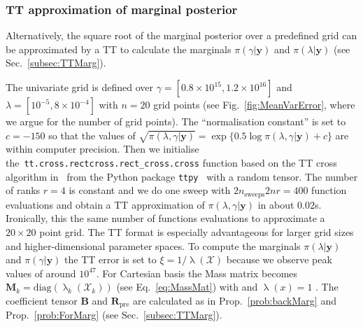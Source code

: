 \subsubsection{TT approximation of marginal posterior}
\label{subsec:TTFirst}
Alternatively, the square root of the marginal posterior over a predefined grid can be approximated by a TT to calculate the marginals $\pi(\gamma|\bm{y})$ and $\pi(\lambda|\bm{y})$ (see Sec.~\ref{subsec:TTMarg}).

The univariate grid is defined over $\gamma = [ 0.8 \times 10^{15},1.2 \times 10^{16}]$ and $\lambda = [ 10^{-5}, 8 \times 10^{-4}]$ with $n = 20$ grid points (see Fig.~\ref{fig:MeanVarError}, where we argue for the number of grid points).
The ``normalisation constant'' is set to $c=-150$ so that the values of $\sqrt{\pi(\lambda,\gamma| \bm{y})}=\exp\{0.5\log\pi(\lambda,\gamma|\bm{y})+c\}$ are within computer precision.
Then we initialise \linebreak the~\texttt{tt.cross.rectcross.rect\_cross.cross} function based on the TT cross algorithm in~\cite{OSELEDETS2010TTCross,Dolgov2018TTCross} from the Python package \texttt{ttpy}~\cite{Oseledets2018ttpy} with a random tensor.
The number of ranks $r = 4$ is constant and we do one sweep with $2n_{\text{sweeps}}2nr =400$ function evaluations and obtain a TT approximation of $\pi( \lambda,\gamma| \bm{y})$ in about $0.02$s.
Ironically, this the same number of functions evaluations to approximate a $20 \times 20$ point grid.
The TT format is especially advantageous for larger grid sizes and higher-dimensional parameter spaces.
To compute the marginals $\pi(\lambda| \bm{y})$ and $\pi(\gamma| \bm{y})$ the TT error is set to $\xi = 1 / \uplambda (\mathcal{X})$ because we observe peak values of around $10^{47}$.
For Cartesian basis the Mass matrix becomes $\bm{M}_k = \text{diag}(\uplambda_k(\mathcal{X}_k))$ (see Eq.~\ref{eq:MassMat}) with and $\uplambda(x) = 1$ .
The coefficient tensor $\bm{B}$ and $\bm{R}_{\text{pre}}$ are calculated as in Prop.~\ref{prob:backMarg} and Prop.~\ref{prob:ForMarg} (see Sec.~\ref{subsec:TTMarg}).


